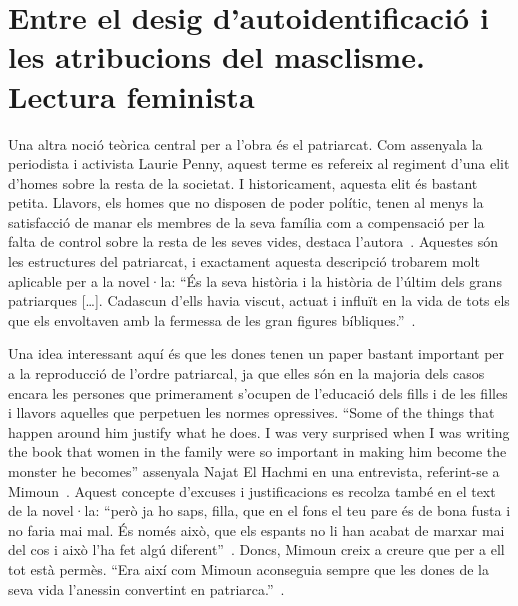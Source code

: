 \section{Entre el desig d'autoidentificació i les atribucions del masclisme. Lectura feminista}

\begin{comment}
  1) autoidentificació
  buscant la seva identitat
  * religió
  * literatura

  2) les atribucions
  * com han de ser les nenes/les dones?
    ** alleine fuer die ganze care arbeit zustaendig, wird als natuerliche neigung inszeniert
  * les dones i les "altres" són culpables per tot (vgl Laurie Penny)
    --> keine Solidaritaet zwischen den Frauen (zb la mare i les amants) moeglich, obwohl sie alle Opfer sind; sie werden gegen einander ausgespielt
  * frauen werden auf ihr aeusseres reduziert
  * die frauen wuerden nie genuegen;
\end{comment}

Una altra noció teòrica central per a l'obra és el patriarcat.
Com assenyala la periodista i activista Laurie Penny, aquest terme es refereix al regiment d'una elit d'homes sobre la resta de la societat.
I historicament, aquesta elit és bastant petita.
Llavors, els homes que no disposen de poder polític, tenen al menys la satisfacció de manar els membres de la seva família com a compensació per la falta de control sobre la resta de les seves vides, destaca l'autora~\autocite[69-70]{Penny2014}.
Aquestes són les estructures del patriarcat, i exactament aquesta descripció trobarem molt aplicable per a la novel·la:
``És la seva història i la història de l'últim dels grans patriarques [\ldots]. Cadascun d'ells havia viscut, actuat i influït en la vida de tots els que els envoltaven amb la fermessa de les gran figures bíbliques.''~\autocite[7]{ElHachmi2008}.

Una idea interessant aquí és que les dones tenen un paper bastant important per a la reproducció de l'ordre patriarcal, ja que elles són en la majoria dels casos encara les persones que primerament s'ocupen de l'educació dels fills i de les filles i llavors aquelles que perpetuen les normes opressives.
``Some of the things that happen around him justify what he does. I was very surprised when I was writing the book that women in the family were so important in making him become the monster he becomes'' assenyala Najat El Hachmi en una entrevista, referint-se a Mimoun~\autocite{HaAM2011}.
Aquest concepte d'excuses i justificacions es recolza també en el text de la novel·la: ``però ja ho saps, filla, que en el fons el teu pare és de bona fusta i no faria mai mal. És només això, que els espants no li han acabat de marxar mai del cos i això l'ha fet algú diferent''~\autocite[18]{ElHachmi2008}.
Doncs, Mimoun creix a creure que per a ell tot està permès.
``Era així com Mimoun aconseguia sempre que les dones de la seva vida l'anessin convertint en patriarca.''~\autocite[99]{ElHachmi2008}.

